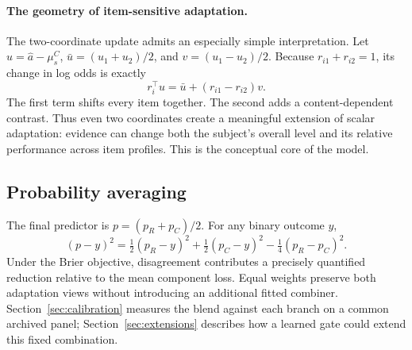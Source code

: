 \paragraph{The geometry of item-sensitive adaptation.}
The two-coordinate update admits an especially simple interpretation. Let $u=\hat a-\mu_s^C$, $\bar u=(u_1+u_2)/2$, and $v=(u_1-u_2)/2$. Because $r_{i1}+r_{i2}=1$, its change in log odds is exactly
\begin{equation}
 r_i^\top u=\bar u+(r_{i1}-r_{i2})v.
 \label{eq:geometry}
\end{equation}
The first term shifts every item together. The second adds a content-dependent contrast. Thus even two coordinates create a meaningful extension of scalar adaptation: evidence can change both the subject's overall level and its relative performance across item profiles. This is the conceptual core of the model.

\subsection{Probability averaging}
The final predictor is $p=(p_R+p_C)/2$. For any binary outcome $y$,
\begin{equation}
 (p-y)^2=\tfrac12(p_R-y)^2+\tfrac12(p_C-y)^2-\tfrac14(p_R-p_C)^2.
 \label{eq:mixture}
\end{equation}
Under the Brier objective, disagreement contributes a precisely quantified reduction relative to the mean component loss. Equal weights preserve both adaptation views without introducing an additional fitted combiner. Section~\ref{sec:calibration} measures the blend against each branch on a common archived panel; Section~\ref{sec:extensions} describes how a learned gate could extend this fixed combination.
